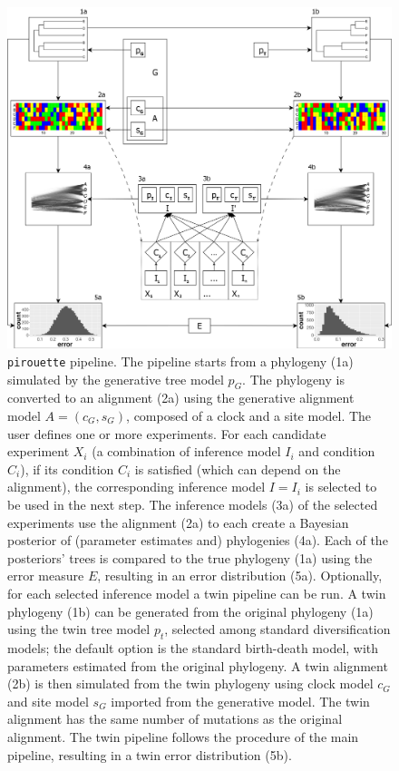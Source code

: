 \begin{figure}
  \centering
  \includegraphics[width = \textwidth]{workflow4.png}
  \caption{
    \texttt{pirouette} pipeline.
    The pipeline starts from a phylogeny (1a) simulated by the generative tree model 
    $\mathit{p_{G}}$.
    The phylogeny is converted to an alignment (2a) using the generative alignment model 
    $\mathit{A} = (\mathit{c_{G}}, \mathit{s_{G}})$, composed of a clock and a site model. 
    The user defines one or more experiments.
    For each candidate experiment $\mathit{X_{i}}$ 
    (a combination of inference model $\mathit{I_{i}}$ and condition $\mathit{C_{i}}$),
    if its condition $\mathit{C_{i}}$ is 
    satisfied (which can depend on the alignment), 
    the corresponding inference model $\mathit{I} = \mathit{I_{i}}$ is selected
    to be used in the next step.
    The inference models (3a) of the selected experiments use the alignment (2a) 
    to each create a Bayesian posterior of (parameter estimates and) 
    phylogenies (4a). 
    Each of the posteriors' trees is compared to the true phylogeny (1a) 
    using the error measure $\mathit{E}$, 
    resulting in an error distribution (5a). 
    Optionally, for each selected inference model a twin pipeline can be run.
    A twin phylogeny (1b) can be generated from the original 
    phylogeny (1a) using the twin tree model $\mathit{p_{t}}$, 
    selected among standard diversification models; 
    the default option is the standard birth-death model, with parameters estimated from the original phylogeny.
    A twin alignment (2b) is then simulated from the twin phylogeny 
    using clock model $\mathit{c_{G}}$ and site model $\mathit{s_{G}}$ 
    imported from the generative model. 
    The twin alignment has the same number of mutations as the original alignment.
    The twin pipeline follows the procedure of the main pipeline, 
    resulting in a twin error distribution (5b).
  }
  \label{fig:pipeline}
\end{figure}

